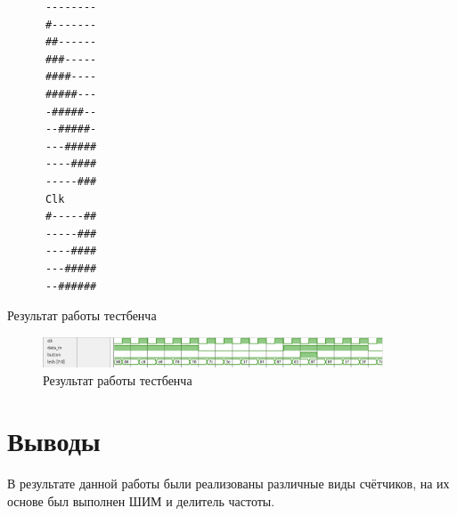 \documentclass[a4paper]{article}
\begin{document}
  \begin{listing}[H]
    \begin{verbatim}
      --------
      #-------
      ##------
      ###-----
      ####----
      #####---
      -#####--
      --#####-
      ---#####
      ----####
      -----###
      Clk
      #-----##
      -----###
      ----####
      ---#####
      --######
    \end{verbatim}
    \caption{Результат работы тестбенча}
  \end{listing}

  \begin{figure}[H]
    \centering
    \includegraphics[width=0.9\textwidth]{lab_330.png}
    \caption{Результат работы тестбенча}
  \end{figure}

  \newpage
  \section{Выводы}

  В результате данной работы были реализованы различные виды счётчиков, на их основе был выполнен ШИМ и делитель частоты.
\end{document}
